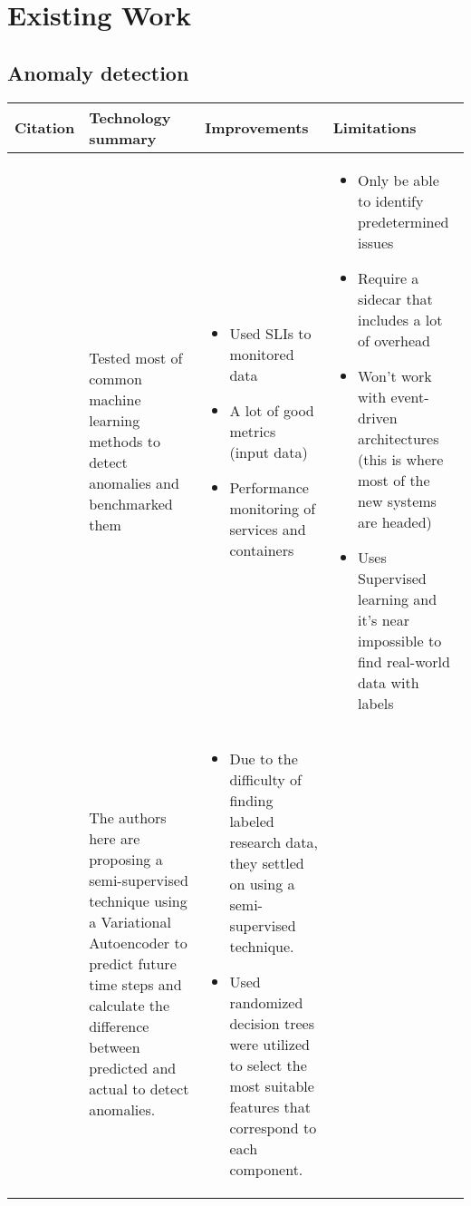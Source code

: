 {\let\clearpage\relax\chapter{Existing Work}}

\section{Anomaly detection}

\begin{longtable}{| p{2cm} | p{4cm} | p{4.5cm} | p{4.5cm} |}
\hline
  \textbf{Citation} &
  \textbf{Technology summary} &
  \textbf{Improvements} &
  \textbf{Limitations} \\ \hline
  \cite{du2018anomaly} &
  Tested most of common machine learning methods to detect anomalies and benchmarked them &
  \vspace{-8mm}
  \begin{itemize}[leftmargin=*,noitemsep,nolistsep] 
    \item Used SLIs to monitored data
    \item A lot of good metrics (input data)
    \item Performance monitoring of services and containers
  \end{itemize} &
  \vspace{-8mm}
  \begin{itemize}[leftmargin=*,noitemsep,nolistsep] 
    \item Only be able to identify predetermined issues
    \item Require a sidecar that includes a lot of overhead
    \item Won't work with event-driven architectures (this is where most of the new systems are headed)
    \item Uses Supervised learning and it's near impossible to find real-world data with labels
  \end{itemize} \\ \hline
  \cite{kumarage2018anomaly} &
  The authors here are proposing a semi-supervised technique using a Variational Autoencoder to predict future time steps and calculate the difference between predicted and actual to detect anomalies. &
  \vspace{-8mm}
  \begin{itemize}[leftmargin=*,noitemsep,nolistsep] 
    \item Due to the difficulty of finding labeled research data, they settled on using a semi-supervised technique.
    \item Used randomized decision trees were utilized to select the most suitable features that correspond to each component.

\end{itemize}
\end{longtable}
